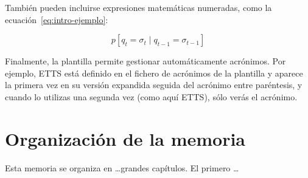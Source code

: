 También pueden incluirse expresiones matemáticas numeradas, como la
ecuación~\ref{eq:intro-ejemplo}:

\begin{equation}
  \label{eq:intro-ejemplo}
  p[q_t=\sigma_t\mid q_{t-1}=\sigma_{t-1}]
\end{equation}

Finalmente, la plantilla permite gestionar automáticamente acrónimos. Por
ejemplo, \ac{ETTS} está definido en el fichero de acrónimos de la plantilla y aparece la primera vez en su versión expandida seguida del acrónimo entre paréntesis, y cuando lo utilizas una segunda vez (como aquí \ac{ETTS}), sólo verás el acrónimo.


\section{Organización de la memoria}
\label{sec:intro-organizacion-memoria}

Esta memoria se organiza en \ldots grandes capítulos. El primero \ldots


